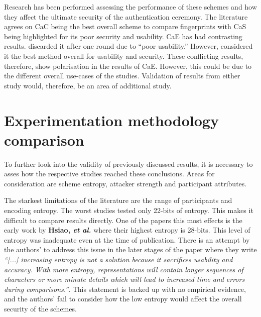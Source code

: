 Research has been performed assessing the performance of these schemes and how they affect the ultimate security of the authentication ceremony. The literature agrees on CaC being the best overall scheme to compare fingerprints \cite{tan2017can}\cite{uzun2007usability} with CaS being highlighted for its poor security and usability. CaE has  had contrasting results. \cite{uzun2007usability} discarded it after one round due to ``poor usability.'' However, \cite{tan2017can} considered it the best method overall for usability and security. These conflicting results, therefore, show polarisation in the results of CaE. However, this could be due to the different overall use-cases of the studies. Validation of results from either study would, therefore, be an area of additional study.


\section*{Experimentation methodology comparison}
To further look into the validity of previously discussed results, it is necessary to asses how the respective studies reached these conclusions. Areas for consideration are scheme entropy, attacker strength and participant attributes.

The starkest limitations of the literature are the range of participants and encoding entropy. The worst studies tested only 22-bits of entropy. This makes it difficult to compare results directly. One of the papers this most effects is the early work by \textbf{Hsiao, \textit{et al.}}\cite{hsiao2009study}  where their highest entropy is 28-bits. This level of entropy was inadequate even at the time of publication. There is an attempt by the authors' to address this issue in the later stages of the paper where they write \textit{``[...] increasing entropy is not a solution because it sacrifices usability and accuracy. With more entropy, representations will contain longer sequences of characters or more minute details which will lead to increased time and errors during comparisons.''}. This statement is backed up with no empirical evidence, and the authors' fail to consider how the low entropy would affect the overall security of the schemes.

